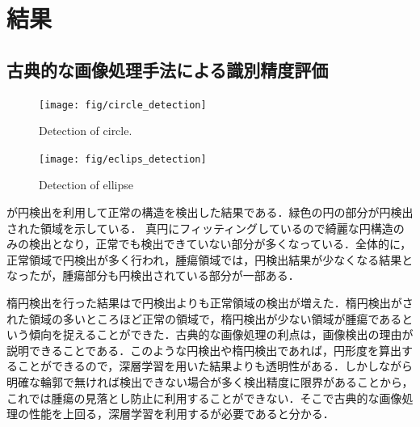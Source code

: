 
\chapter{結果}\label{chap_result}

\section{古典的な画像処理手法による識別精度評価}
\begin{figure}[H]
	\centering
	\texttt{[image: fig/circle\_detection]}
	\caption{Detection of circle.}
	\label{fig:circle_detection}
\end{figure}

\begin{figure}[H]
	\centering
	\texttt{[image: fig/eclips\_detection]}
	\caption{Detection of ellipse}
	\label{fig:ellipse_detection}
\end{figure}

が円検出を利用して正常の構造を検出した結果である．緑色の円の部分が円検出された領域を示している．
真円にフィッティングしているので綺麗な円構造のみの検出となり，正常でも検出できていない部分が多くなっている．全体的に，正常領域で円検出が多く行われ，腫瘍領域では，円検出結果が少なくなる結果となったが，腫瘍部分も円検出されている部分が一部ある．

楕円検出を行った結果はで円検出よりも正常領域の検出が増えた．楕円検出がされた領域の多いところほど正常の領域で，楕円検出が少ない領域が腫瘍であるという傾向を捉えることができた．古典的な画像処理の利点は，画像検出の理由が説明できることである．このような円検出や楕円検出であれば，円形度を算出することができるので，深層学習を用いた結果よりも透明性がある．しかしながら明確な輪郭で無ければ検出できない場合が多く検出精度に限界があることから，これでは腫瘍の見落とし防止に利用することができない．そこで古典的な画像処理の性能を上回る，深層学習を利用するが必要であると分かる．

